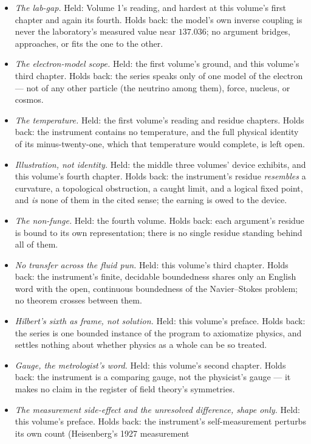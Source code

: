 \begin{itemize}
\item \emph{The lab-gap.} Held: Volume 1's reading, and hardest at this
volume's first chapter and again its fourth. Holds back: the model's own
inverse coupling is never the laboratory's measured value near $137.036$;
no argument bridges, approaches, or fits the one to the other.
\item \emph{The electron-model scope.} Held: the first volume's ground, and
this volume's third chapter. Holds back: the series speaks only of one
model of the electron --- not of any other particle (the neutrino among
them), force, nucleus, or cosmos.
\item \emph{The temperature.} Held: the first volume's reading and residue
chapters. Holds back: the instrument contains no temperature, and the full
physical identity of its minus-twenty-one, which that temperature would
complete, is left open.
\item \emph{Illustration, not identity.} Held: the middle three volumes'
device exhibits, and this volume's fourth chapter. Holds back: the
instrument's residue \emph{resembles} a curvature, a topological
obstruction, a caught limit, and a logical fixed point, and \emph{is}
none of them in the cited sense; the earning is owed to the device.
\item \emph{The non-funge.} Held: the fourth volume. Holds back: each
argument's residue is bound to its own representation; there is no single
residue standing behind all of them.
\item \emph{No transfer across the fluid pun.} Held: this volume's third
chapter. Holds back: the instrument's finite, decidable boundedness shares
only an English word with the open, continuous boundedness of the
Navier--Stokes problem; no theorem crosses between them.
\item \emph{Hilbert's sixth as frame, not solution.} Held: this volume's
preface. Holds back: the series is one bounded instance of the program to
axiomatize physics, and settles nothing about whether physics as a whole
can be so treated.
\item \emph{Gauge, the metrologist's word.} Held: this volume's second
chapter. Holds back: the instrument is a comparing gauge, not the
physicist's gauge --- it makes no claim in the register of field theory's
symmetries.
\item \emph{The measurement side-effect and the unresolved difference, shape
only.} Held: this volume's preface. Holds back: the instrument's
self-measurement perturbs its own count (Heisenberg's 1927 measurement

\end{itemize}
